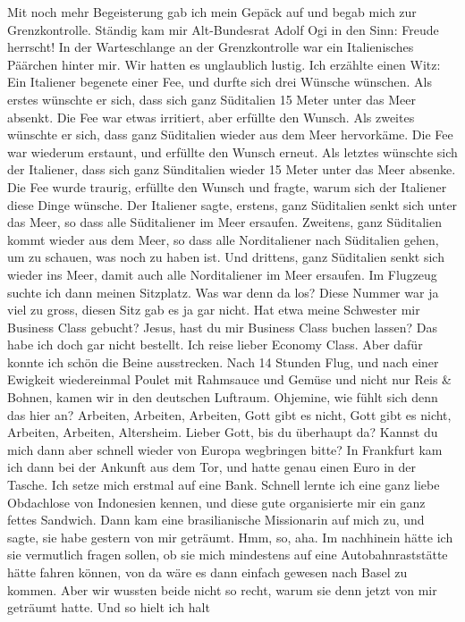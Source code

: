 \documentclass[
]{article}
\begin{document}
Mit noch mehr Begeisterung gab ich mein Gepäck auf und begab mich zur
Grenzkontrolle. Ständig kam mir Alt-Bundesrat Adolf Ogi in den Sinn:
Freude herrscht! In der Warteschlange an der Grenzkontrolle war ein
Italienisches Päärchen hinter mir. Wir hatten es unglaublich lustig. Ich
erzählte einen Witz: Ein Italiener begenete einer Fee, und durfte sich
drei Wünsche wünschen. Als erstes wünschte er sich, dass sich ganz
Süditalien 15 Meter unter das Meer absenkt. Die Fee war etwas irritiert,
aber erfüllte den Wunsch. Als zweites wünschte er sich, dass ganz
Süditalien wieder aus dem Meer hervorkäme. Die Fee war wiederum
erstaunt, und erfüllte den Wunsch erneut. Als letztes wünschte sich der
Italiener, dass sich ganz Sünditalien wieder 15 Meter unter das Meer
absenke. Die Fee wurde traurig, erfüllte den Wunsch und fragte, warum
sich der Italiener diese Dinge wünsche. Der Italiener sagte, erstens,
ganz Süditalien senkt sich unter das Meer, so dass alle Süditaliener im
Meer ersaufen. Zweitens, ganz Süditalien kommt wieder aus dem Meer, so
dass alle Norditaliener nach Süditalien gehen, um zu schauen, was noch
zu haben ist. Und drittens, ganz Süditalien senkt sich wieder ins Meer,
damit auch alle Norditaliener im Meer ersaufen. Im Flugzeug suchte ich
dann meinen Sitzplatz. Was war denn da los? Diese Nummer war ja viel zu
gross, diesen Sitz gab es ja gar nicht. Hat etwa meine Schwester mir
Business Class gebucht? Jesus, hast du mir Business Class buchen lassen?
Das habe ich doch gar nicht bestellt. Ich reise lieber Economy Class.
Aber dafür konnte ich schön die Beine ausstrecken. Nach 14 Stunden Flug,
und nach einer Ewigkeit wiedereinmal Poulet mit Rahmsauce und Gemüse und
nicht nur Reis \& Bohnen, kamen wir in den deutschen Luftraum. Ohjemine,
wie fühlt sich denn das hier an? Arbeiten, Arbeiten, Arbeiten, Gott gibt
es nicht, Gott gibt es nicht, Arbeiten, Arbeiten, Altersheim. Lieber
Gott, bis du überhaupt da? Kannst du mich dann aber schnell wieder von
Europa wegbringen bitte? In Frankfurt kam ich dann bei der Ankunft aus
dem Tor, und hatte genau einen Euro in der Tasche. Ich setze mich
erstmal auf eine Bank. Schnell lernte ich eine ganz liebe Obdachlose von
Indonesien kennen, und diese gute organisierte mir ein ganz fettes
Sandwich. Dann kam eine brasilianische Missionarin auf mich zu, und
sagte, sie habe gestern von mir geträumt. Hmm, so, aha. Im nachhinein
hätte ich sie vermutlich fragen sollen, ob sie mich mindestens auf eine
Autobahnraststätte hätte fahren können, von da wäre es dann einfach
gewesen nach Basel zu kommen. Aber wir wussten beide nicht so recht,
warum sie denn jetzt von mir geträumt hatte. Und so hielt ich halt
\end{document}
